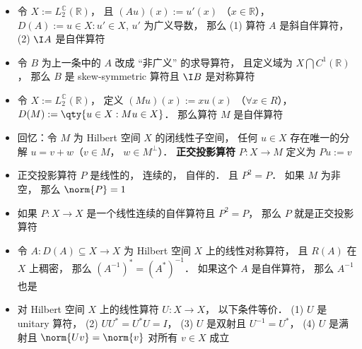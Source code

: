 \begin{itemize}
\item 令 $X := L_2^{\mathbb C}(\mathbb R)$， 且 $(Au)(x) := u'(x)$ （$x \in \mathbb R$）， $D(A) := {u\in X: u'\in X}$, $u'$ 为广义导数， 那么 (1) 算符 $A$ 是斜自伴算符， (2) $\I A$ 是自伴算符

\item 令 $B$ 为上一条中的 $A$ 改成 “非广义” 的求导算符， 且定义域为 $X \bigcap C^1(\mathbb R)$， 那么 $B$ 是 skew-symmetric 算符且 $\I B$ 是对称算符

\item 令 $X := L_2^{\mathbb C}(\mathbb R)$， 定义 $(Mu)(x) := xu(x)$ （$\forall x\in R$）， $D(M) := \qty{u\in X: Mu\in X}$． 那么算符 $M$ 是自伴算符

\item 回忆：令 $M$ 为 Hilbert 空间 $X$ 的闭线性子空间， 任何 $u\in X$ 存在唯一的分解 $u = v+w$（$v\in M$， $w \in M^\bot$）． \textbf{正交投影算符} $P:X\to M$ 定义为 $Pu := v$

\item 正交投影算符 $P$ 是线性的， 连续的， 自伴的． 且 $P^2 = P$． 如果 $M$ 为非空， 那么 $\norm{P} = 1$

\item 如果 $P:X\to X$ 是一个线性连续的自伴算符且 $P^2 = P$， 那么 $P$ 就是正交投影算符

\item 令 $A:D(A)\subseteq X\to X$ 为 Hilbert 空间 $X$ 上的线性对称算符， 且 $R(A)$ 在 $X$ 上稠密， 那么 $(A^{-1})^* = (A^*)^{-1}$． 如果这个 $A$ 是自伴算符， 那么 $A^{-1}$ 也是

\item 对 Hilbert 空间 $X$ 上的线性算符 $U:X\to X$， 以下条件等价． (1) $U$ 是 unitary 算符， (2) $UU^* = U^*U = I$， (3) $U$ 是双射且 $U^{-1} = U^*$， (4) $U$ 是满射且 $\norm{Uv} = \norm{v}$ 对所有 $v\in X$ 成立
\end{itemize}

